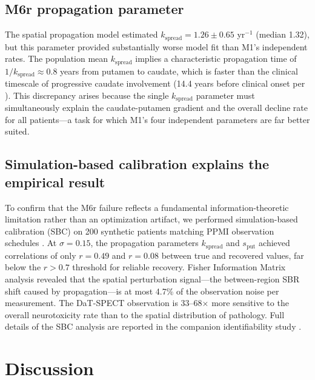 \subsection{M6r propagation parameter}

The spatial propagation model estimated $k_{\text{spread}} = 1.26 \pm 0.65$ yr$^{-1}$ (median 1.32), but this parameter provided substantially worse model fit than M1's independent rates. The population mean $k_{\text{spread}}$ implies a characteristic propagation time of $1/k_{\text{spread}} \approx 0.8$ years from putamen to caudate, which is faster than the clinical timescale of progressive caudate involvement (14.4 years before clinical onset per \cite{kim2022}). This discrepancy arises because the single $k_{\text{spread}}$ parameter must simultaneously explain the caudate-putamen gradient and the overall decline rate for all patients---a task for which M1's four independent parameters are far better suited.

\subsection{Simulation-based calibration explains the empirical result}

To confirm that the M6r failure reflects a fundamental information-theoretic limitation rather than an optimization artifact, we performed simulation-based calibration (SBC) on 200 synthetic patients matching PPMI observation schedules \cite{talts2018}. At $\sigma = 0.15$, the propagation parameters $k_{\text{spread}}$ and $s_{\text{put}}$ achieved correlations of only $r = 0.49$ and $r = 0.08$ between true and recovered values, far below the $r > 0.7$ threshold for reliable recovery. Fisher Information Matrix analysis revealed that the spatial perturbation signal---the between-region SBR shift caused by propagation---is at most 4.7\% of the observation noise per measurement. The DaT-SPECT observation is 33--68$\times$ more sensitive to the overall neurotoxicity rate than to the spatial distribution of pathology. Full details of the SBC analysis are reported in the companion identifiability study \cite{dupre2026paper8a}.

\section{Discussion}

